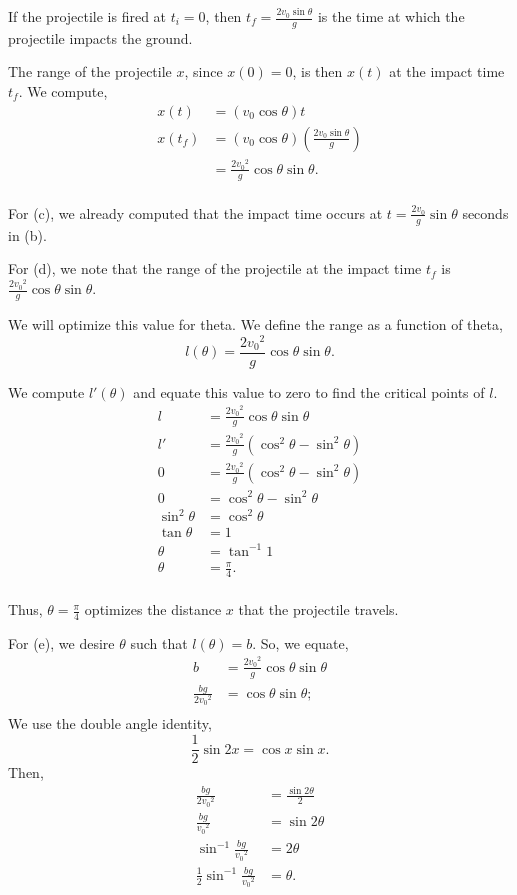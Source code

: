\documentclass[../hw10]{subfiles}
\begin{document}
If the projectile is fired at $t_i=0$, then $t_f=\frac{2v_0\sin{\theta}}{g}$ is the time at which the projectile impacts the ground.

The range of the projectile $x$, since $x(0)=0$, is then $x(t)$ at the impact time $t_f$. We compute,
\begin{align*}
    x(t) &= (v_0\cos{\theta})t \\
    x(t_f) &= (v_0\cos{\theta})\left( \frac{2v_0\sin{\theta}}{g} \right) \\
    &= \frac{2{v_0}^2}{g}\cos{\theta}\sin{\theta}. \\
\end{align*}

For (c), we already computed that the impact time occurs at $t=\frac{2v_0}{g}\sin{\theta}$ seconds in (b).

For (d), we note that the range of the projectile at the impact time $t_f$ is $\frac{2{v_0}^2}{g}\cos{\theta}\sin{\theta}$. 

We will optimize this value for theta. We define the range as a function of theta, \[l(\theta)=\frac{2{v_0}^2}{g}\cos{\theta}\sin{\theta}.\]

We compute $l'(\theta)$ and equate this value to zero to find the critical points of $l$.
\begin{align*}
    l&=\frac{2{v_0}^2}{g}\cos{\theta}\sin{\theta} \\
    l'&=\frac{2{v_0}^2}{g}\left( \cos^2{\theta} - \sin^2{\theta}\right) \\
    0&=\frac{2{v_0}^2}{g}\left( \cos^2{\theta} - \sin^2{\theta}\right) \\
    0&=\cos^2{\theta}-\sin^2{\theta} \\
    \sin^2{\theta}&=\cos^2{\theta} \\
    \tan{\theta}&=1 \\
    \theta&=\tan^{-1}{1} \\
    \theta&=\frac{\pi}{4}. \\
\end{align*}

Thus, $\theta=\frac{\pi}{4}$ optimizes the distance $x$ that the projectile travels.

For (e), we desire $\theta$ such that $l(\theta)=b$.
So, we equate,
\begin{align*}
    b&=\frac{2{v_0}^2}{g}\cos{\theta}\sin{\theta} \\
    \frac{bg}{2{v_0}^2}&=\cos{\theta}\sin{\theta}; \\
\end{align*}
We use the double angle identity, \[\frac{1}{2}\sin{2x}=\cos{x}\sin{x}.\]
Then,
\begin{align*}
    \frac{bg}{2{v_0}^2}&=\frac{\sin{2\theta}}{2} \\
    \frac{bg}{{v_0}^2}&=\sin{2\theta} \\
    \sin^{-1}{\frac{bg}{{v_0}^2}} &= 2\theta \\
    \frac{1}{2}\sin^{-1}{\frac{bg}{{v_0}^2}} &= \theta. \\
\end{align*}
\end{document}
